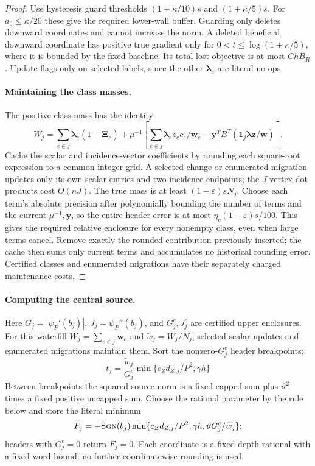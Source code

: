 \documentclass[11pt]{article}
\theoremstyle{remark}
\newcommand{\llambda}{\boldsymbol{\lambda}}
\newcommand{\ww}{\mathbf w}
\newcommand{\yy}{\mathbf y}
\newcommand{\zz}{\mathbf z}
\newcommand{\XXibar}{\overline{\boldsymbol{\Xi}}}
\newcommand{\sgn}{\textsc{Sgn}}
\begin{document}
\begin{proof}
Use hysteresis guard thresholds $(1+\kappa/10)s$ and $(1+\kappa/5)s$.
For $a_0\le\kappa/20$ these give the required lower-wall buffer.
Guarding only deletes downward coordinates and cannot increase the norm.
A deleted beneficial downward coordinate has positive true gradient only for
$0<t\le\log(1+\kappa/5)$, where it is bounded by the fixed baseline.
Its total lost objective is at most $ChB_R$.
Update flags only on selected labels, since the other $\llambda_e$ are literal
no-ops.

\paragraph{Maintaining the class masses.}
The positive class mass has the identity
\[
 W_j=\sum_{e\in j}\llambda_e(1-\XXibar_e)+
 \mu^{-1}\left[\sum_{e\in j}\llambda_ez_ec_e/\ww_e
 -\yy^TB^T(\mathbf1_j\llambda \zz/\ww)\right].
\]
Cache the scalar and incidence-vector coefficients by rounding each square-root
expression to a common integer grid.
A selected change or enumerated migration updates only its own scalar entries
and two incidence endpoints; the $J$ vertex dot products cost $O(nJ)$.
The true mass is at least $(1-\varepsilon)sN_j$.
Choose each term's absolute precision after polynomially bounding the number of
terms and the current $\mu^{-1},\yy$, so the entire header error is at most
$\eta_c(1-\varepsilon)s/100$.
This gives the required relative enclosure for every nonempty class, even when
large terms cancel.
Remove exactly the rounded contribution previously inserted; the cache then sums
only current terms and accumulates no historical rounding error.
Certified classes and enumerated migrations have their separately charged
maintenance costs.
\end{proof}

\paragraph{Computing the central source.}
Here $G_j=|\psi_P'(b_j)|$, $J_j=\psi_P''(b_j)$, and $G_j^c,J_j^c$ are certified
upper enclosures.
For this waterfill $W_j=\sum_{e\in j}\ww_e$ and $\widetilde w_j=W_j/N_j$; selected
scalar updates and enumerated migrations maintain them.
Sort the nonzero-$G_j^c$ header breakpoints:
\[
 t_j=\frac{\widetilde w_j}{G^c_j}
            \min\{c_Zd_{Z,j}/P^2,\gamma h\}
\]
Between breakpoints the squared source norm is a fixed capped sum plus
$\vartheta^2$ times a fixed positive uncapped sum.
Choose the rational parameter by the rule below and store the literal minimum
\[
 F_j=-\sgn(b_j)
 \min\{c_Zd_{Z,j}/P^2,\gamma h,
                         \vartheta G^c_j/\widetilde w_j\};
\]
headers with $G_j^c=0$ return $F_j=0$.
Each coordinate is a fixed-depth rational with a fixed word bound; no further
coordinatewise rounding is used.
\end{document}
